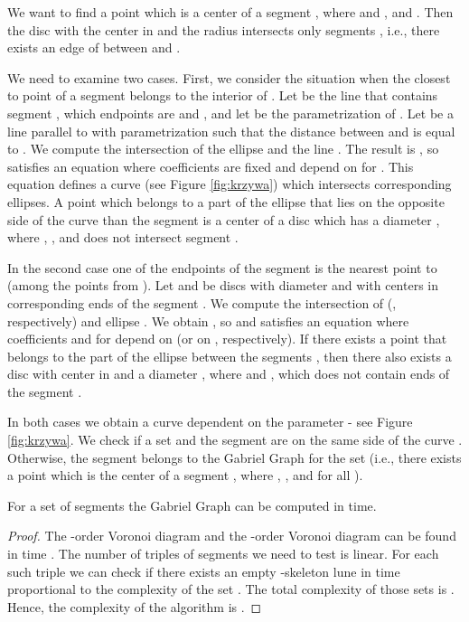 \documentclass[11pt]{llncs}
\begin{document}
We want to find a point  which is a center of a segment 
, where  and , and .
 Then the disc with the center in  and the radius 
intersects only segments , i.e., there exists an edge of 
between  and . 

We need to examine two cases. 
First, we consider the situation when the closest to  point of a segment  belongs
to the interior of .  
Let  be the line that contains segment , which endpoints are  
and , and let  be 
the parametrization of . Let  be a line parallel to  with 
parametrization  such that 
the distance between  and  is equal to . We compute the intersection 
of the ellipse  and the line . 
The result is 
, so  satisfies an equation 
 where coefficients  are fixed and depend on 
 for .
This equation defines a curve  (see Figure \ref{fig:krzywa}) which intersects 
corresponding ellipses. A point  which belongs to a part of the ellipse that lies 
on the opposite side of the curve  than the segment  is a center of  a disc
which has a diameter , where , , and does not
intersect segment . 



In the second case one of the endpoints of the segment  is the nearest point to  (among the points from ). 
Let  and  be discs with diameter  and with centers in corresponding 
ends of the segment .  
We compute the intersection of  
(, respectively) and ellipse 
. We obtain 
, so 
 and  satisfies an equation 
 where coefficients  and  
for  depend on  (or on 
, respectively). 
If there exists a point  that belongs to 
the part of the ellipse between the segments , then there also exists  
a disc with center in  and a diameter , where  
and , which does not contain ends of the segment .

In both cases we obtain a curve  dependent on the parameter  
- see Figure \ref{fig:krzywa}.
We check if a set 
and the segment  are on the same side of the curve .
Otherwise, the segment  belongs to the Gabriel Graph for the set 
(i.e., there exists a point  which is the center of a segment 
, where , , and 
for all ).




\begin{theorem}
For a set of  segments  the Gabriel Graph  can be computed in  
time.
\end{theorem}
\begin{proof}
The -order Voronoi diagram and the -order Voronoi diagram can be found in  
time \cite{pz13}. The number of triples of segments we need to test is linear. 
For each such triple we can check if there exists an empty -skeleton lune
in time proportional to the complexity of the set 
.
The total complexity of those sets is . 
Hence, the complexity of the algorithm is .
\end{proof}
\end{document}
